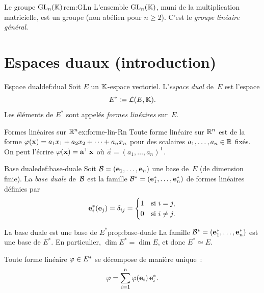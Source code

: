 \begin{remark}{Le groupe $\operatorname{GL}_n({\mathbb{K}})$}{rem:GLn}
  L'ensemble $\operatorname{GL}_n({\mathbb{K}})$, muni de la multiplication matricielle, est un
  groupe (non abélien pour $n\geq 2$). C'est le \emph{groupe linéaire
  général}.
\end{remark}

\section{Espaces duaux (introduction)}\label{sec:dual}

\begin{definition}{Espace dual}{def:dual}
  Soit $E$ un ${\mathbb{K}}$-espace vectoriel. L'\emph{espace dual}%
   de~$E$ est l'espace
  \[
    E^*\coloneqq{\mathcal{L}}(E,{\mathbb{K}}).
  \]
  Les éléments de $E^*$ sont appelés \emph{formes linéaires}%
   sur~$E$.
\end{definition}

\begin{example}{Formes linéaires sur ${\mathbb{R}}^n$}{ex:forme-lin-Rn}
  Toute forme linéaire sur ${\mathbb{R}}^n$ est de la forme
  $\varphi(\mathbf{x})=a_1 x_1+a_2 x_2+\cdots+a_n x_n$ pour des scalaires
  $a_1,\ldots,a_n\in{\mathbb{R}}$ fixés. On peut l'écrire
  $\varphi(\mathbf{x})={\mathbf{a}}^{\mathsf{T}}\,\mathbf{x}$ où
  $\vec{a}=(a_1,\ldots,a_n)^{\mathsf{T}}$.
\end{example}

\begin{definition}{Base duale}{def:base-duale}
  Soit ${\mathcal{B}}=(\mathbf{e}_{1},\ldots,\mathbf{e}_{n})$ une base de~$E$ (de dimension
  finie). La \emph{base duale} de~${\mathcal{B}}$ est la famille
  ${\mathcal{B}}^*=(\mathbf{e}_{1}^*,\ldots,\mathbf{e}_{n}^*)$ de formes linéaires définies
  par
  \[
    \mathbf{e}_{i}^*(\mathbf{e}_{j})=\delta_{ij}=
    \begin{cases}1&\text{si }i=j,\\0&\text{si }i\neq j.\end{cases}
  \]
\end{definition}

\begin{proposition}{La base duale est une base de $E^*$}{prop:base-duale}
  La famille ${\mathcal{B}}^*=(\mathbf{e}_{1}^*,\ldots,\mathbf{e}_{n}^*)$ est une base de
  $E^*$. En particulier, $\dim E^*=\dim E$, et donc $E^*\simeq E$.

  Toute forme linéaire $\varphi\in E^*$ se décompose de manière unique~:
  \[
    \varphi=\sum_{i=1}^n\varphi(\mathbf{e}_{i})\,\mathbf{e}_{i}^*.
  \]
\end{proposition}

